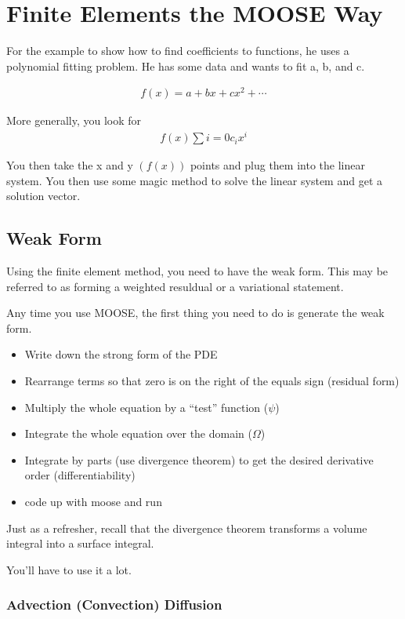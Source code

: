 \section{Finite Elements the MOOSE Way}

For the example to show how to find coefficients to functions, he uses a 
polynomial fitting problem. He has some data and wants to fit a, b, and c. 

\begin{align}
  f(x) = a+bx+cx^2 +\cdots
  \label{polynomial}
\end{align}

More generally, you look for 
\begin{align}
  f(x)\sum{i=0}c_ix^i
  \label{lin_poly}
\end{align}

You then take the x and y $(f(x))$ points and plug them into the linear system. 
You then use some magic method to solve the linear system and get a solution 
vector. 

\subsection{Weak Form}
Using the finite element method, you need to have the weak form. This may be 
referred to as forming a weighted resuldual or a variational statement.

Any time you use MOOSE, the first thing you need to do is generate the weak 
form. 


\begin{itemize}
  \item Write down the strong form of the PDE
  \item Rearrange terms so that zero is on the right of the equals sign (residual form)
  \item Multiply the whole equation by a ``test'' function ($\psi$)
  \item Integrate the whole equation over the domain ($\Omega$) 
  \item Integrate by parts (use divergence theorem) to get the desired 
    derivative order (differentiability)
  \item code up with moose and run
\end{itemize}

Just as a refresher, recall that the divergence theorem transforms a volume 
integral into a surface integral.  

You'll have to use it a lot. 


\subsubsection{Advection (Convection) Diffusion}


